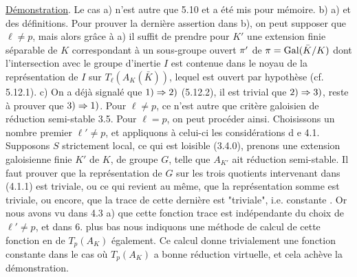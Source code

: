 \uline{Démonstration}. Le cas a) n'est autre que 5.10 et a été mis pour mémoire.
b)   a) et des définitions. Pour prouver la dernière assertion dans b), on peut  supposer que $\ell\neq p$, mais alors grâce à a) il suffit de prendre pour $K'$ une extension finie séparable de $K$ correspondant à un sous-groupe ouvert $\pi'$ de $\pi=\mathrm{Gal}(\bar K/K)$ dont l'intersection avec le groupe d'inertie $I$ est contenue dans le  noyau de la représentation de $I$ sur $T_{\ell}(A_K(\bar K))$, lequel est  ouvert par hypothèse (cf. 5.12.1).
c) On a déjà signalé que $1)\Rightarrow2)$ (5.12.2), il est trivial que $2)\Rightarrow3)$, reste à prouver que $3)\Rightarrow1)$. Pour $\ell\neq p$, ce n'est autre que  critère galoisien de réduction semi-stable 3.5. Pour $\ell=p$, on peut procéder ainsi. Choisissons un nombre premier $\ell'\neq p$, et appliquons à celui-ci les considérations d e 4.1. 
Supposons $S$ strictement local, ce qui est loisible (3.4.0), prenons une extension galoisienne finie $K'$ de $K$, de groupe $G$, telle que $A_{K'}$ ait réduction semi-stable. Il faut prouver que la représentation de $G$ sur les trois quotients intervenant dans (4.1.1) est triviale, ou ce qui revient au même, que la  représentation somme est triviale, ou encore, que la trace de cette dernière est "triviale", i.e. constante . Or nous avons vu dans 4.3 a) que cette fonction trace est indépendante du choix de $\ell'\neq p$, et dans 6. plus bas nous indiquons une méthode de calcul de cette fonction en  de $T_p(A_K)$ également. Ce calcul donne trivialement une fonction constante dans le cas où $T_p(A_K)$ a bonne réduction virtuelle, et cela achève la démonstration.
